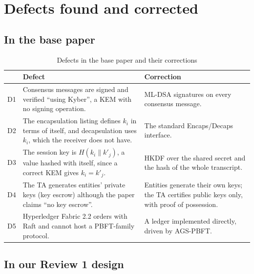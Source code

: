 \section{Defects found and corrected}
\label{sec:defects}

\subsection{In the base paper}

\begin{table}[h]
\centering
\caption{Defects in the base paper and their corrections}
\label{tab:defects}
\begin{tabular}{@{}p{0.6cm}p{6.2cm}p{6.8cm}@{}}
\toprule
& Defect & Correction \\
\midrule
D1 & Consensus messages are signed and verified ``using Kyber'', a KEM with no signing operation. & ML-DSA signatures on every consensus message. \\
D2 & The encapsulation listing defines $k_i$ in terms of itself, and decapsulation uses $k_i$, which the receiver does not have. & The standard \textsf{Encaps}/\textsf{Decaps} interface. \\
D3 & The session key is $H(k_i \parallel k'_j)$, a value hashed with itself, since a correct KEM gives $k_i = k'_j$. & HKDF over the shared secret and the hash of the whole transcript. \\
D4 & The TA generates entities' private keys (key escrow) although the paper claims ``no key escrow''. & Entities generate their own keys; the TA certifies public keys only, with proof of possession. \\
D5 & Hyperledger Fabric 2.2 orders with Raft and cannot host a PBFT-family protocol. & A ledger implemented directly, driven by AGS-PBFT. \\
\bottomrule
\end{tabular}
\end{table}

\subsection{In our Review 1 design}

